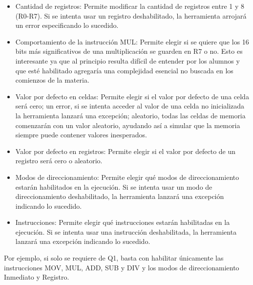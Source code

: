 \begin{itemize}
  \item Cantidad de registros: Permite modificar la cantidad de registros entre 1 y 8 (R0-R7). Si se intenta usar un registro deshabilitado, la 
  herramienta arrojará un error especificando lo sucedido.
  \item Comportamiento de la instrucción MUL: Permite elegir si se quiere que los 16 bits más significativos de una multiplicación se guarden en R7 o no.
  Esto es interesante ya que al principio resulta difícil de entender por los alumnos y que esté habilitado agregaría una complejidad esencial no 
  buscada en los comienzos de la materia.
  \item Valor por defecto en celdas: Permite elegir si el valor por defecto de una celda será cero; un error, si se intenta acceder al valor de una 
  celda no inicializada la herramienta lanzará una excepción; aleatorio, todas las celdas de memoria comenzarán con un valor aleatorio, 
  ayudando así a simular que la memoria siempre puede contener valores inesperados.
  \item Valor por defecto en registros: Permite elegir si el valor por defecto de un registro será cero o aleatorio.
  \item Modos de direccionamiento: Permite elegir qué modos de direccionamiento estarán habilitados en la ejecución. Si se intenta usar un modo de direccionamiento 
  deshabilitado, la herramienta lanzará una excepción indicando lo sucedido. 
  \item Instrucciones: Permite elegir qué instrucciones estarán habilitadas en la ejecución. Si se intenta usar una instrucción 
  deshabilitada, la herramienta lanzará una excepción indicando lo sucedido. 
\end{itemize}

Por ejemplo, si solo se requiere de Q1, basta con habilitar únicamente las instrucciones MOV, MUL, ADD, SUB y DIV y los modos de direccionamiento Inmediato y Registro.